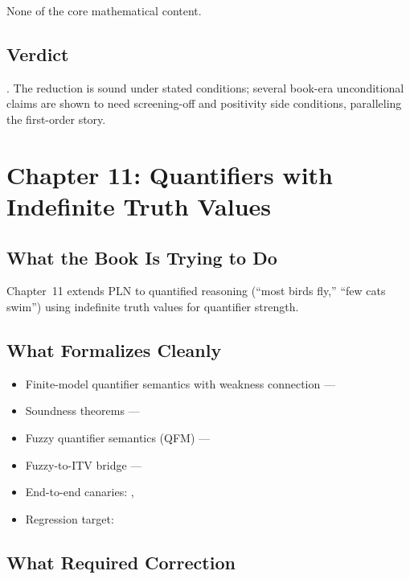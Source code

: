 \documentclass[11pt,openany]{report}
\begin{document}
None of the core mathematical content.

\section{Verdict}

\verdictCorrected{}.  The reduction is sound under stated conditions;
several book-era unconditional claims are shown to need screening-off
and positivity side conditions, paralleling the first-order story.


\chapter{Chapter 11: Quantifiers with Indefinite Truth Values}
\label{ch:review-ch11}

\section{What the Book Is Trying to Do}

Chapter~11 extends PLN to quantified reasoning (``most birds fly,''
``few cats swim'') using indefinite truth values for quantifier
strength.

\section{What Formalizes Cleanly}

\begin{itemize}
\item Finite-model quantifier semantics with weakness connection ---
\item Soundness theorems ---
\item Fuzzy quantifier semantics (QFM) ---
\item Fuzzy-to-ITV bridge ---
\item End-to-end canaries:
  ,
\item Regression target:
\end{itemize}

\section{What Required Correction}
\end{document}
